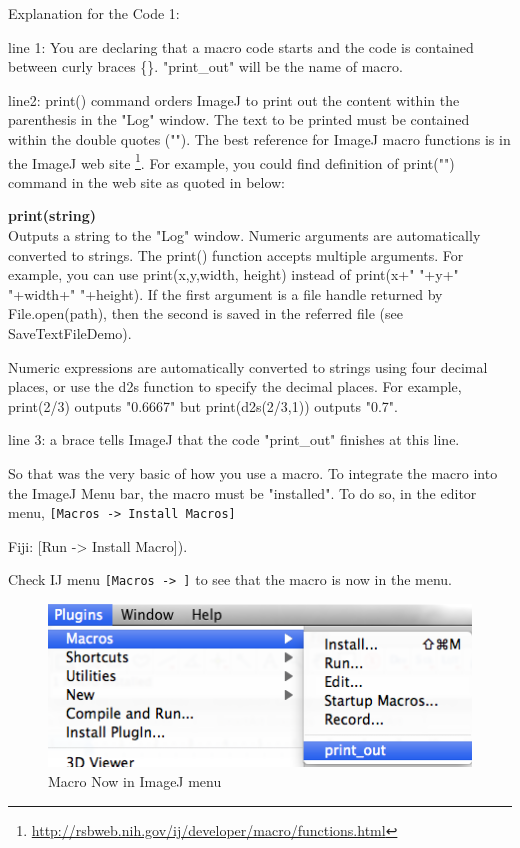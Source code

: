 \documentclass[11pt,a4paper,oneside]{report}
\newenvironment{indentFiji}%
{\begin{list}{}%
         {\setlength{\leftmargin}{1em}}%
         \item[]%
}
{\end{list}}
\newenvironment{indentCom}%
{\begin{list}{}%
         {\setlength{\leftmargin}{1em}}%
         \item[]%
}
{\end{list}}
\newcommand{\ijmenu}[1]{\texttt{\small#1}}
\begin{document}
Explanation for the Code 1:\\
\begin{itemize}
\item line 1: You are declaring that a macro code starts and the code is contained between 
curly braces \{\}. "print\_out" will be the name of macro. 

\item line2: print() command orders ImageJ to print out the content within the parenthesis 
in the "Log" window. The text to be printed must be contained within the double quotes (""). 
The best reference for ImageJ macro functions is in the ImageJ web site
\footnote{\url{http://rsbweb.nih.gov/ij/developer/macro/functions.html}}. 
For example, you could find definition of print("") command in the web site as quoted in below:\\
\begin{indentCom}
\textbf{print(string)}\\
Outputs a string to the "Log" window. Numeric arguments are automatically converted to strings. 
The print() function accepts multiple arguments. For example, you can use print(x,y,width, height) 
instead of print(x+" "+y+" "+width+" "+height). 
If the first argument is a file handle returned by File.open(path), 
then the second is saved in the referred file (see SaveTextFileDemo).

Numeric expressions are automatically converted to strings using four decimal places, 
or use the d2s function to specify the decimal places. 
For example, print(2/3) outputs "0.6667" but print(d2s(2/3,1)) outputs "0.7".
\end{indentCom}

\item line 3: a brace tells ImageJ that the code "print\_out" finishes at this line.  
\end{itemize}
So that was the very basic of how you use a macro. To integrate the macro into the ImageJ Menu bar, 
the macro must be "installed". To do so, in the editor menu, \ijmenu{[Macros -> Install Macros]} 
\begin{indentFiji}
Fiji: [Run -> Install Macro]).
\end{indentFiji}
Check IJ menu \ijmenu{[Macros -> ]} to see that the macro is now in the menu.\\

\begin{figure}[htbp]
\begin{center}
\includegraphics[scale=0.6]{fig/firstMacroInMenu.png}
\caption{Macro Now in ImageJ menu} \label{fig_MacroInMenu}
\end{center}
\end{figure}
\end{document}
